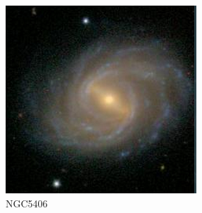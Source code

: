 \documentclass[9pt]{revtex4-1}
\begin{document}
\begin{figure}
\includegraphics[scale=0.3]{NGC5406.png}
\caption{NGC5406}
\end{figure}

\end{document}
